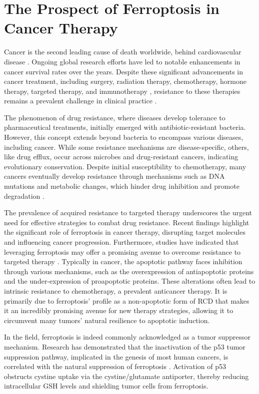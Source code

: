 \section{The Prospect of Ferroptosis in Cancer Therapy}

Cancer is the second leading cause of death worldwide, behind cardiovascular disease \citep{cancer}. Ongoing global research efforts have led to notable enhancements in cancer survival rates over the years. Despite these significant advancements in cancer treatment, including surgery, radiation therapy, chemotherapy, hormone therapy, targeted therapy, and immunotherapy \citep{therapies}, resistance to these therapies remains a prevalent challenge in clinical practice \citep{therapy_resistance}.

The phenomenon of drug resistance, where diseases develop tolerance to pharmaceutical treatments, initially emerged with antibiotic-resistant bacteria. However, this concept extends beyond bacteria to encompass various diseases, including cancer. While some resistance mechanisms are disease-specific, others, like drug efflux, occur across microbes and drug-resistant cancers, indicating evolutionary conservation. Despite initial susceptibility to chemotherapy, many cancers eventually develop resistance through mechanisms such as DNA mutations and metabolic changes, which hinder drug inhibition and promote degradation \citep{therapy_resistance2}.

The prevalence of acquired resistance to targeted therapy underscores the urgent need for effective strategies to combat drug resistance. Recent findings highlight the significant role of ferroptosis in cancer therapy, disrupting target molecules and influencing cancer progression. Furthermore, studies have indicated that leveraging ferroptosis may offer a promising avenue to overcome resistance to targeted therapy \citep{ferro_drugs}. Typically in cancer, the apoptotic pathway faces inhibition through various mechanisms, such as the overexpression of antiapoptotic proteins and the under-expression of proapoptotic proteins. These alterations often lead to intrinsic resistance to chemotherapy, a prevalent anticancer therapy. It is primarily due to ferroptosis' profile as a non-apoptotic form of \ac{RCD} that makes it an incredibly promising avenue for new therapy strategies, allowing it to circumvent many tumors' natural resilience to apoptotic induction.

In the field, ferroptosis is indeed commonly acknowledged as a tumor suppressor mechanism. Research has demonstrated that the inactivation of the p53 tumor suppression pathway, implicated in the genesis of most human cancers, is correlated with the natural suppression of ferroptosis \citep{p53}. Activation of p53 obstructs cystine uptake via the cystine/glutamate antiporter, thereby reducing intracellular \ac{GSH} levels and shielding tumor cells from ferroptosis. 

